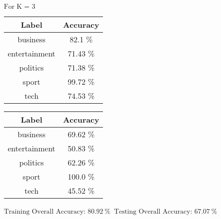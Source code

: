 \documentclass[8pt]{extarticle}
\begin{document}
    $\displaystyle \text{For K = }3$
    \begin{center}
        \quad
    \end{center}
    \begin{center}
        \begin{tabular}{cc}
            \hline
            Label & Accuracy\\
            \hline
            business &   82.1 \% \\
       entertainment &   71.43 \% \\
           politics  &   71.38 \% \\
              sport  &   99.72 \% \\
               tech  &   74.53 \%
         \end{tabular}
         \quad
        \begin{tabular}{cc}
            \hline
            Label & Accuracy\\
            \hline
            business &   69.62 \% \\
        entertainment &  50.83 \% \\
           politics  &   62.26 \% \\
              sport  &   100.0  \% \\
               tech  &   45.52 \%
        \end{tabular}
    \end{center}
    \begin{center}
        $\displaystyle \text{Training Overall Accuracy:\ }80.92\ \%$
        $\displaystyle \ \text{Testing Overall Accuracy:\ }67.07\ \%$
    \end{center}
\end{document}

